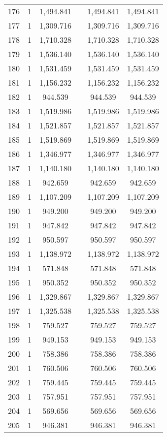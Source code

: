 \begin{table}[!htbp]
\begin{tabular}{@{\extracolsep{5pt}}lccccc}
176 & 1 & 1,494.841 &  & 1,494.841 & 1,494.841 \\ 
177 & 1 & 1,309.716 &  & 1,309.716 & 1,309.716 \\ 
178 & 1 & 1,710.328 &  & 1,710.328 & 1,710.328 \\ 
179 & 1 & 1,536.140 &  & 1,536.140 & 1,536.140 \\ 
180 & 1 & 1,531.459 &  & 1,531.459 & 1,531.459 \\ 
181 & 1 & 1,156.232 &  & 1,156.232 & 1,156.232 \\ 
182 & 1 & 944.539 &  & 944.539 & 944.539 \\ 
183 & 1 & 1,519.986 &  & 1,519.986 & 1,519.986 \\ 
184 & 1 & 1,521.857 &  & 1,521.857 & 1,521.857 \\ 
185 & 1 & 1,519.869 &  & 1,519.869 & 1,519.869 \\ 
186 & 1 & 1,346.977 &  & 1,346.977 & 1,346.977 \\ 
187 & 1 & 1,140.180 &  & 1,140.180 & 1,140.180 \\ 
188 & 1 & 942.659 &  & 942.659 & 942.659 \\ 
189 & 1 & 1,107.209 &  & 1,107.209 & 1,107.209 \\ 
190 & 1 & 949.200 &  & 949.200 & 949.200 \\ 
191 & 1 & 947.842 &  & 947.842 & 947.842 \\ 
192 & 1 & 950.597 &  & 950.597 & 950.597 \\ 
193 & 1 & 1,138.972 &  & 1,138.972 & 1,138.972 \\ 
194 & 1 & 571.848 &  & 571.848 & 571.848 \\ 
195 & 1 & 950.352 &  & 950.352 & 950.352 \\ 
196 & 1 & 1,329.867 &  & 1,329.867 & 1,329.867 \\ 
197 & 1 & 1,325.538 &  & 1,325.538 & 1,325.538 \\ 
198 & 1 & 759.527 &  & 759.527 & 759.527 \\ 
199 & 1 & 949.153 &  & 949.153 & 949.153 \\ 
200 & 1 & 758.386 &  & 758.386 & 758.386 \\ 
201 & 1 & 760.506 &  & 760.506 & 760.506 \\ 
202 & 1 & 759.445 &  & 759.445 & 759.445 \\ 
203 & 1 & 757.951 &  & 757.951 & 757.951 \\ 
204 & 1 & 569.656 &  & 569.656 & 569.656 \\ 
205 & 1 & 946.381 &  & 946.381 & 946.381 \\ 

\end{tabular}
\end{table}
